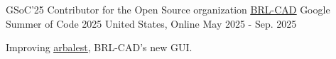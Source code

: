

\begin{cventries}

  \cventry
    {GSoC'25 Contributor for the Open Source organization \underline{\href{https://github.com/BRL-CAD/brlcad}{BRL-CAD}}} %
    {Google Summer of Code 2025} %
    {United States, Online} %
    {May 2025 - Sep. 2025} %
    {
      \begin{cvitems} %
        \item {Improving \underline{\href{https://github.com/BRL-CAD/arbalest}{arbalest}}, BRL-CAD's new GUI.}
      \end{cvitems}
    }

\end{cventries}
